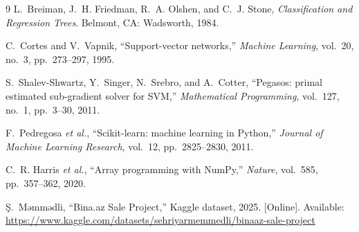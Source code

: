 \documentclass[10pt,twocolumn,a4paper]{article}
\begin{document}
\begin{thebibliography}{9}
L.~Breiman, J.~H. Friedman, R.~A. Olshen, and C.~J. Stone,
\emph{Classification and Regression Trees}. Belmont, CA: Wadsworth, 1984.

C.~Cortes and V.~Vapnik, ``Support-vector networks,''
\emph{Machine Learning}, vol.~20, no.~3, pp.~273--297, 1995.

S.~Shalev-Shwartz, Y.~Singer, N.~Srebro, and A.~Cotter,
``Pegasos: primal estimated sub-gradient solver for SVM,''
\emph{Mathematical Programming}, vol.~127, no.~1, pp.~3--30, 2011.

F.~Pedregosa \emph{et al.}, ``Scikit-learn: machine learning in Python,''
\emph{Journal of Machine Learning Research}, vol.~12, pp.~2825--2830, 2011.

C.~R. Harris \emph{et al.}, ``Array programming with NumPy,''
\emph{Nature}, vol.~585, pp.~357--362, 2020.

Ş.~Məmmədli, ``Bina.az Sale Project,'' Kaggle dataset,
2025. [Online]. Available:
\url{https://www.kaggle.com/datasets/sehriyarmemmedli/binaaz-sale-project}
\end{thebibliography}
\end{document}
